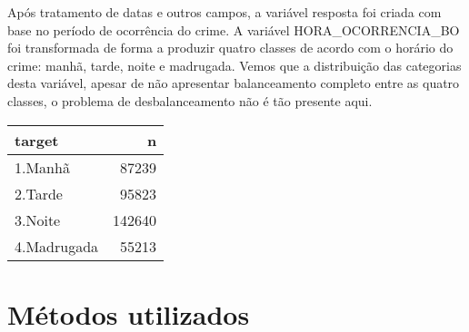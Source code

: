 \documentclass[
  12pt,
]{report}
\newenvironment{Shaded}{\begin{snugshade}}{\end{snugshade}}
\newcommand{\AttributeTok}[1]{\textcolor[rgb]{0.77,0.63,0.00}{#1}}
\newcommand{\DecValTok}[1]{\textcolor[rgb]{0.00,0.00,0.81}{#1}}
\newcommand{\FunctionTok}[1]{\textcolor[rgb]{0.00,0.00,0.00}{#1}}
\newcommand{\NormalTok}[1]{#1}
\newcommand{\OtherTok}[1]{\textcolor[rgb]{0.56,0.35,0.01}{#1}}
\newcommand{\SpecialCharTok}[1]{\textcolor[rgb]{0.00,0.00,0.00}{#1}}
\newcommand{\StringTok}[1]{\textcolor[rgb]{0.31,0.60,0.02}{#1}}
\begin{document}
\begin{Shaded}
\end{Shaded}

Após tratamento de datas e outros campos, a variável resposta foi criada com base no período de ocorrência do crime. A variável HORA\_OCORRENCIA\_BO foi transformada de forma a produzir quatro classes de acordo com o horário do crime: manhã, tarde, noite e madrugada. Vemos que a distribuição das categorias desta variável, apesar de não apresentar balanceamento completo entre as quatro classes, o problema de desbalanceamento não é tão presente aqui.

\begin{tabular}{l|r}
\hline
target & n\\
\hline
1.Manhã & 87239\\
\hline
2.Tarde & 95823\\
\hline
3.Noite & 142640\\
\hline
4.Madrugada & 55213\\
\hline
\end{tabular}

\hypertarget{muxe9todos-utilizados}{%
\section{Métodos utilizados}\label{muxe9todos-utilizados}}
\end{document}
